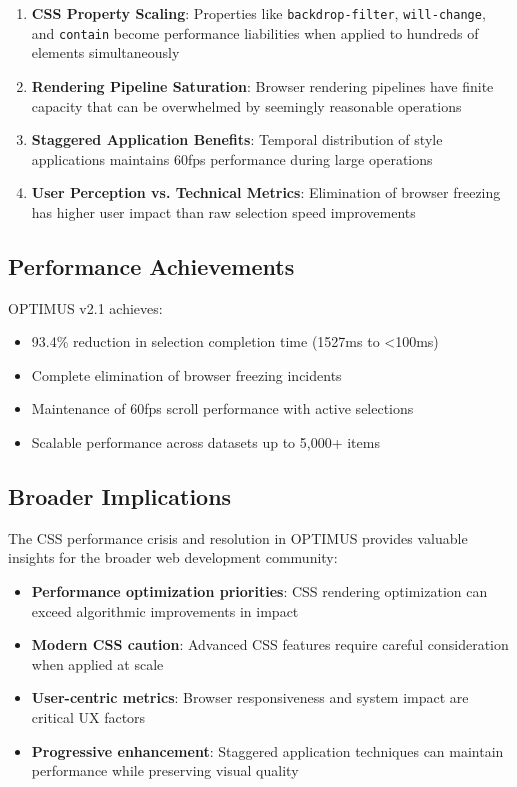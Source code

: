 \documentclass[10pt]{article}
\begin{document}
\begin{enumerate}
    \item \textbf{CSS Property Scaling}: Properties like \texttt{backdrop-filter}, \texttt{will-change}, and \texttt{contain} become performance liabilities when applied to hundreds of elements simultaneously
    \item \textbf{Rendering Pipeline Saturation}: Browser rendering pipelines have finite capacity that can be overwhelmed by seemingly reasonable operations
    \item \textbf{Staggered Application Benefits}: Temporal distribution of style applications maintains 60fps performance during large operations
    \item \textbf{User Perception vs. Technical Metrics}: Elimination of browser freezing has higher user impact than raw selection speed improvements
\end{enumerate}

\subsection{Performance Achievements}

OPTIMUS v2.1 achieves:
\begin{itemize}
    \item 93.4\% reduction in selection completion time (1527ms to <100ms)
    \item Complete elimination of browser freezing incidents
    \item Maintenance of 60fps scroll performance with active selections
    \item Scalable performance across datasets up to 5,000+ items
\end{itemize}

\subsection{Broader Implications}

The CSS performance crisis and resolution in OPTIMUS provides valuable insights for the broader web development community:

\begin{itemize}
    \item \textbf{Performance optimization priorities}: CSS rendering optimization can exceed algorithmic improvements in impact
    \item \textbf{Modern CSS caution}: Advanced CSS features require careful consideration when applied at scale
    \item \textbf{User-centric metrics}: Browser responsiveness and system impact are critical UX factors
    \item \textbf{Progressive enhancement}: Staggered application techniques can maintain performance while preserving visual quality
\end{itemize}
\end{document}
